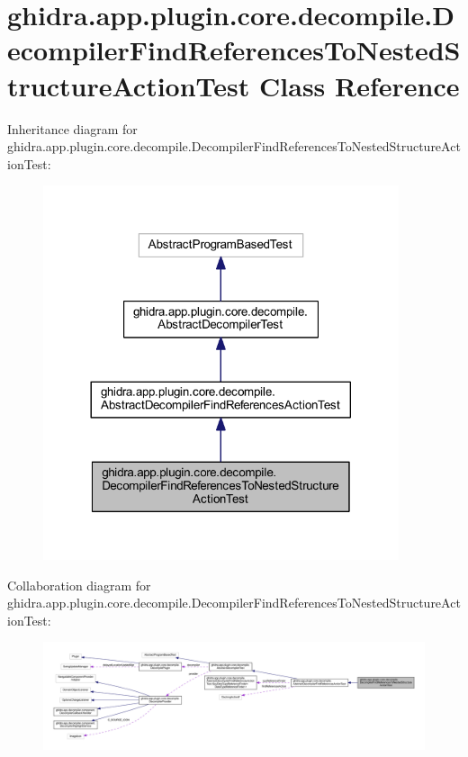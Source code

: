 \hypertarget{classghidra_1_1app_1_1plugin_1_1core_1_1decompile_1_1_decompiler_find_references_to_nested_structure_action_test}{}\section{ghidra.\+app.\+plugin.\+core.\+decompile.\+Decompiler\+Find\+References\+To\+Nested\+Structure\+Action\+Test Class Reference}
\label{classghidra_1_1app_1_1plugin_1_1core_1_1decompile_1_1_decompiler_find_references_to_nested_structure_action_test}


Inheritance diagram for ghidra.\+app.\+plugin.\+core.\+decompile.\+Decompiler\+Find\+References\+To\+Nested\+Structure\+Action\+Test\+:
\nopagebreak
\begin{figure}[H]
\begin{center}
\leavevmode
\includegraphics[width=296pt]{classghidra_1_1app_1_1plugin_1_1core_1_1decompile_1_1_decompiler_find_references_to_nested_struce2978658d510623ce3f96d1dfe4c190a}
\end{center}
\end{figure}


Collaboration diagram for ghidra.\+app.\+plugin.\+core.\+decompile.\+Decompiler\+Find\+References\+To\+Nested\+Structure\+Action\+Test\+:
\nopagebreak
\begin{figure}[H]
\begin{center}
\leavevmode
\includegraphics[width=350pt]{classghidra_1_1app_1_1plugin_1_1core_1_1decompile_1_1_decompiler_find_references_to_nested_structure_action_test__coll__graph}
\end{center}
\end{figure}
